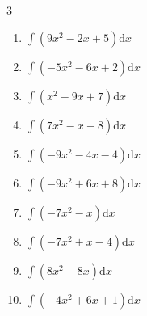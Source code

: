 \begin{multicols}{3}
\begin{enumerate}

\columnbreak %

  \item $\displaystyle \int \left( 9x^{2}-2x+5 \right) \mathrm{d}x$


  \item $\displaystyle \int \left( -5x^{2}-6x+2 \right) \mathrm{d}x$


  \item $\displaystyle \int \left( x^{2}-9x+7 \right) \mathrm{d}x$


  \item $\displaystyle \int \left( 7x^{2}-x-8 \right) \mathrm{d}x$


  \item $\displaystyle \int \left( -9x^{2}-4x-4 \right) \mathrm{d}x$


  \item $\displaystyle \int \left( -9x^{2}+6x+8 \right) \mathrm{d}x$


  \item $\displaystyle \int \left( -7x^{2}-x \right) \mathrm{d}x$


  \item $\displaystyle \int \left( -7x^{2}+x-4 \right) \mathrm{d}x$


  \item $\displaystyle \int \left( 8x^{2}-8x \right) \mathrm{d}x$


  \item $\displaystyle \int \left( -4x^{2}+6x+1 \right) \mathrm{d}x$


\end{enumerate}
\end{multicols}
